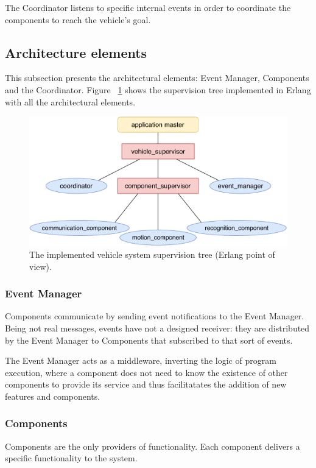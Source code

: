 \documentclass{memoir}
\begin{document}
The Coordinator listens to specific internal events in order to coordinate the components to reach the vehicle's goal.

\subsection{Architecture elements}

This subsection presents the architectural elements: Event Manager, Components and the Coordinator. Figure ~\ref{fig:erlang-point-of-view} shows the supervision tree implemented in Erlang with all the architectural elements.

\begin{figure}
	\centering
	\includegraphics[width=0.8\linewidth]{implementation_details/erlang_point-of-view.pdf}
	\caption{The implemented vehicle system supervision tree (Erlang point of view).}
	\label{fig:erlang-point-of-view}
\end{figure}

\subsubsection{Event Manager}

Components communicate by sending event notifications to the Event Manager.
Being not real messages, events have not a designed receiver: they are distributed by the Event Manager to Components that subscribed to that sort of events.

The Event Manager acts as a middleware, inverting the logic of program execution, where a component does not need to know the existence of other components to provide its service and thus facilitatates the addition of new features and components.

\subsubsection{Components}

Components are the only providers of functionality. Each component delivers a specific functionality to the system.
\end{document}
